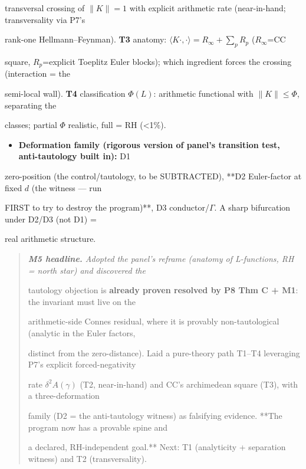 \documentclass[10pt]{article}
\begin{document}
  transversal crossing of $\|K\|=1$ with explicit arithmetic rate (near-in-hand; transversality via P7's\par
  rank-one Hellmann--Feynman). \textbf{T3} anatomy: $\langle K\cdot,\cdot\rangle=R_\infty+\sum_p R_p$ ($R_\infty$=CC\par
  square, $R_p$=explicit Toeplitz Euler blocks); which ingredient forces the crossing (interaction = the\par
  semi-local wall). \textbf{T4} classification $\Phi(L)$: arithmetic functional with $\|K\|\le\Phi$, separating the\par
  classes; partial $\Phi$ realistic, full = RH (<1\%).\par
\begin{itemize}
\item \textbf{Deformation family (rigorous version of panel's transition test, anti-tautology built in):} D1
\end{itemize}
  zero-position (the control/tautology, to be SUBTRACTED), **D2 Euler-factor at fixed $d$ (the witness --- run\par
  FIRST to try to destroy the program)**, D3 conductor/$\Gamma$. A sharp bifurcation under D2/D3 (not D1) =\par
  real arithmetic structure.\par

\begin{quote}\itshape
\textbf{M5 headline.} Adopted the panel's reframe (anatomy of L-functions, RH = north star) and discovered the\par
tautology objection is \textbf{already proven resolved by P8 Thm C + M1}: the invariant must live on the\par
arithmetic-side Connes residual, where it is provably non-tautological (analytic in the Euler factors,\par
distinct from the zero-distance). Laid a pure-theory path T1--T4 leveraging P7's explicit forced-negativity\par
rate $\delta^2A(\gamma)$ (T2, near-in-hand) and CC's archimedean square (T3), with a three-deformation\par
family (D2 = the anti-tautology witness) as falsifying evidence. **The program now has a provable spine and\par
a declared, RH-independent goal.** Next: T1 (analyticity + separation witness) and T2 (transversality).\par
\end{quote}
\end{document}
